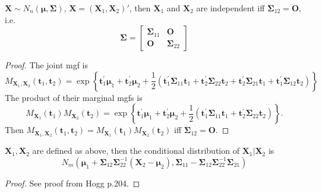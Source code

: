 \begin{theorem}
$\mathbf{X}\sim N_n(\boldsymbol{\mu},\boldsymbol{\Sigma})$, $\mathbf{X}=(\mathbf{X}_{1},\mathbf{X}_{2})'$, then $\mathbf{X}_{1}$ and $\mathbf{X}_{2}$ are independent iff $\boldsymbol{\Sigma}_{12}=\mathbf{O}$, i.e.
\[
\boldsymbol{\Sigma}=\begin{bmatrix}
\boldsymbol{\Sigma}_{11}  & \mathbf{O} \\ \mathbf{O} & \boldsymbol{\Sigma}_{22}
\end{bmatrix}
\]
\end{theorem}
\begin{proof}
The joint mgf is
\[
M_{\mathbf{X}_1, \mathbf{X}_2}\left(\mathbf{t}_1, \mathbf{t}_2\right)=\exp \left\{\mathbf{t}_1^{\prime} \boldsymbol{\mu}_1+\mathbf{t}_2^{\prime} \boldsymbol{\mu}_2+\frac{1}{2}\left(\mathbf{t}_1^{\prime} \boldsymbol{\Sigma}_{11} \mathbf{t}_1+\mathbf{t}_2^{\prime} \boldsymbol{\Sigma}_{22} \mathbf{t}_2+\mathbf{t}_2^{\prime} \boldsymbol{\Sigma}_{21} \mathbf{t}_1+\mathbf{t}_1^{\prime} \boldsymbol{\Sigma}_{12} \mathbf{t}_2\right)\right\}
\]
The product of their marginal mgfs is
\[
M_{\mathbf{X}_1}\left(\mathbf{t}_1\right) M_{\mathbf{X}_2}\left(\mathbf{t}_2\right)=\exp \left\{\mathbf{t}_1^{\prime} \boldsymbol{\mu}_1+\mathbf{t}_2^{\prime} \boldsymbol{\mu}_2+\frac{1}{2}\left(\mathbf{t}_1^{\prime} \boldsymbol{\Sigma}_{11} \mathbf{t}_1+\mathbf{t}_2^{\prime} \boldsymbol{\Sigma}_{22} \mathbf{t}_2\right)\right\} .
\]
Then $M_{\mathbf{X}_{1},\mathbf{X}_{2}}(\mathbf{t}_{1},\mathbf{t}_{2})=M_{\mathbf{X}_{1}}(\mathbf{t}_{1})M_{\mathbf{X}_{2}}(\mathbf{t}_{2})$ iff $\boldsymbol{\Sigma}_{12}=\mathbf{O}$.
\end{proof}

\begin{theorem}
$\mathbf{X}_{1},\mathbf{X}_{2}$ are defined as above, then the conditional distribution of $\mathbf{X}_{1}|\mathbf{X}_{2}$ is
\[
N_m\left(\boldsymbol{\mu}_1+\boldsymbol{\Sigma}_{12} \boldsymbol{\Sigma}_{22}^{-1}\left(\mathbf{X}_2-\boldsymbol{\mu}_2\right), \boldsymbol{\Sigma}_{11}-\boldsymbol{\Sigma}_{12} \boldsymbol{\Sigma}_{22}^{-1} \boldsymbol{\Sigma}_{21}\right)
\]
\end{theorem}
\begin{proof}
See proof from Hogg p.204.
\end{proof}

